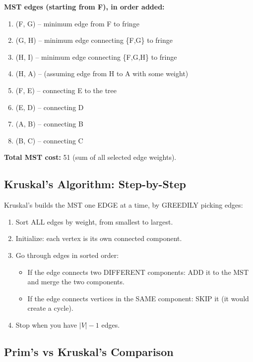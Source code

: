 \documentclass[12pt,portrait]{article}
\begin{document}
\textbf{MST edges (starting from F), in order added:}
\begin{enumerate}[leftmargin=*]
    \item (F, G) -- minimum edge from F to fringe
    \item (G, H) -- minimum edge connecting \{F,G\} to fringe
    \item (H, I) -- minimum edge connecting \{F,G,H\} to fringe
    \item (H, A) -- (assuming edge from H to A with some weight)
    \item (F, E) -- connecting E to the tree
    \item (E, D) -- connecting D
    \item (A, B) -- connecting B
    \item (B, C) -- connecting C
\end{enumerate}
\textbf{Total MST cost:} 51 (sum of all selected edge weights).

\subsection{Kruskal's Algorithm: Step-by-Step}

\begin{rulebox}
Kruskal's builds the MST one EDGE at a time, by GREEDILY picking edges:

\begin{enumerate}[leftmargin=*]
    \item Sort ALL edges by weight, from smallest to largest.
    \item Initialize: each vertex is its own connected component.
    \item Go through edges in sorted order:
    \begin{itemize}[leftmargin=*]
        \item If the edge connects two DIFFERENT components: ADD it to the MST and merge the two components.
        \item If the edge connects vertices in the SAME component: SKIP it (it would create a cycle).
    \end{itemize}
    \item Stop when you have $|V|-1$ edges.
\end{enumerate}
\end{rulebox}

\subsection{Prim's vs Kruskal's Comparison}
\end{document}
